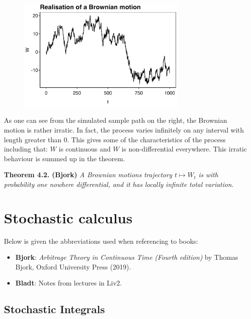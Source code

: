 \documentclass[a4paper,12pt,openany]{book}
\providecommand{\tightlist}{%
 \setlength{\itemsep}{0pt}\setlength{\parskip}{0pt}}
\begin{document}
\begin{figure}[H]
  \begin{center}
    \includegraphics[width=0.75\textwidth]{figures/BM_sim.png}
  \end{center}
\end{figure}

As one can see from the simulated sample path on the right, the Brownian motion is rather irratic. In fact, the process varies infinitely on any interval with length greater than 0. This gives some of the characteristics of the process including that: \(W\) is continuous and \(W\) is non-differential everywhere. This irratic behaviour is summed up in the theorem.

\textbf{Theorem 4.2. (Bjork)} \emph{A Brownian motions trajectory \(t\mapsto W_t\) is with probability one nowhere differential, and it has locally infinite total variation.}

\hypertarget{stochastic-calculus}{%
\chapter{Stochastic calculus}\label{stochastic-calculus}}

Below is given the abbreviations used when referencing to books:

\begin{itemize}
\tightlist
\item
  \textbf{Bjork}: \emph{Arbitrage Theory in Continuous Time (Fourth edition)} by Thomas Bjork, Oxford University Press (2019).\cite{bjork2009}
\item
  \textbf{Bladt}: Notes from lectures in Liv2.
\end{itemize}

\hypertarget{stochastic-integrals}{%
\section{Stochastic Integrals}\label{stochastic-integrals}}
\end{document}
